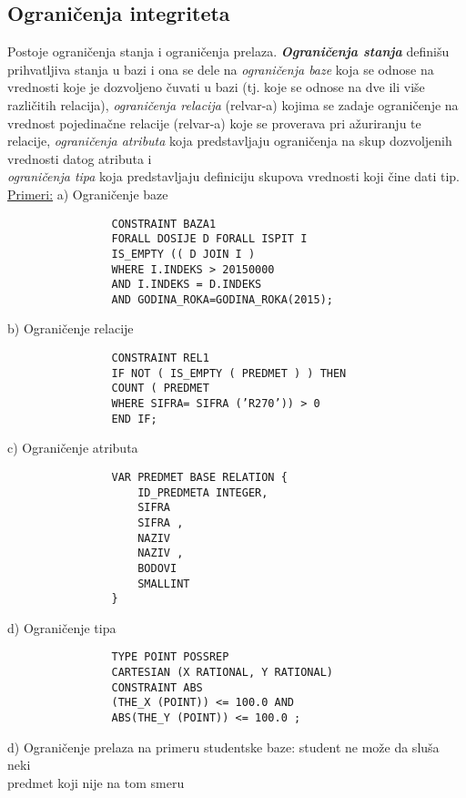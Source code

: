 \documentclass{article}
\begin{document}
\subsection{Ograničenja integriteta}
Postoje ograničenja stanja i ograničenja prelaza. \newline
\textbf{\textit{Ograničenja stanja}} definišu prihvatljiva
stanja u bazi i ona se dele na \textit{ograničenja baze} koja se odnose
na vrednosti koje je dozvoljeno čuvati u bazi (tj. koje se odnose na
dve ili više različitih relacija), \textit{ograničenja relacija}
(relvar-a) kojima se zadaje ograničenje na vrednost pojedinačne
relacije (relvar-a) koje se proverava pri ažuriranju te relacije,
\textit{ograničenja atributa} koja predstavljaju ograničenja na skup
dozvoljenih vrednosti datog atributa i \\ \textit{ograničenja tipa}
koja predstavljaju definiciju skupova vrednosti koji čine dati tip.
\vspace{0.2cm}\newline
\underline{Primeri:}
a) Ograničenje baze
\begin{verbatim}
                CONSTRAINT BAZA1
                FORALL DOSIJE D FORALL ISPIT I
                IS_EMPTY (( D JOIN I )
                WHERE I.INDEKS > 20150000
                AND I.INDEKS = D.INDEKS
                AND GODINA_ROKA=GODINA_ROKA(2015);
\end{verbatim}
\hspace*{1.3cm}
b) Ograničenje relacije
\begin{verbatim}
                CONSTRAINT REL1
                IF NOT ( IS_EMPTY ( PREDMET ) ) THEN
                COUNT ( PREDMET
                WHERE SIFRA= SIFRA (’R270’)) > 0
                END IF;
\end{verbatim}
\vspace{1.5cm}
\hspace*{1.3cm} 
c) Ograničenje atributa
\begin{verbatim}
                VAR PREDMET BASE RELATION {
                    ID_PREDMETA INTEGER,
                    SIFRA
                    SIFRA ,
                    NAZIV
                    NAZIV ,
                    BODOVI
                    SMALLINT
                }
\end{verbatim}
\hspace*{1.3cm} 
d) Ograničenje tipa
\begin{verbatim}
                TYPE POINT POSSREP
                CARTESIAN (X RATIONAL, Y RATIONAL)
                CONSTRAINT ABS
                (THE_X (POINT)) <= 100.0 AND
                ABS(THE_Y (POINT)) <= 100.0 ;
\end{verbatim}
\hspace*{1.3cm} 
d) Ograničenje prelaza na primeru studentske baze: student ne može da
sluša neki \\ \hspace*{1.9cm}predmet koji nije na tom smeru
\end{document}
